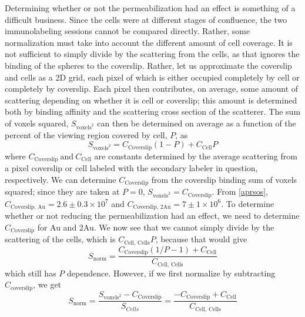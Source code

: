 Determining whether or not the permeabilization had an effect is something of a difficult business. Since the cells were at different stages of confluence, the two immunolabeling sessions cannot be compared directly. Rather, some normalization must take into account the different amount of cell coverage. It is not sufficient to simply divide by the scattering from the cells, as that ignores the binding of the spheres to the coverslip. Rather, let us approximate the coverslip and cells as a 2D grid, each pixel of which is either occupied completely by cell or completely by coverslip. Each pixel then contributes, on average, some amount of scattering depending on whether it is cell or coverslip; this amount is determined both by binding affinity and the scattering cross section of the scatterer. The sum of voxels squared, $S_{\mathrm{voxels}^2}$ can then be determined on average as a function of the percent of the viewing region covered by cell, $P$, as
\[S_{\mathrm{voxels}^2}=C_{\mathrm{Coverslip}}(1-P)+C_{\mathrm{Cell}}P\]
where $C_{\mathrm{Coverslip}}\mathrm{\ and\ }C_{\mathrm{Cell}}$ are constants determined by the average scattering from a pixel coverslip or cell labeled with the secondary labeler in question, respectively. We can determine $C_{\mathrm{Coverslip}}$ from the coverslip binding sum of voxels squared; since they are taken at $P=0$, $S_{\mathrm{voxels}^2}=C_{\mathrm{Coverslip}}$. From \autoref{aprsos}, $C_{\mathrm{Coverslip,\,Au}}=2.6\pm0.3\times10^7$ and $C_{\mathrm{Coverslip,\,2Au}}=7\pm1\times10^6$. To determine whether or not reducing the permeabilization had an effect, we need to determine $C_{\mathrm{Coverslip}}$ for Au and 2Au. We now see that we cannot simply divide by the scattering of the cells, which is $C_{\mathrm{Cell,\,Cells}}P$, because that would give
\[S_{\mathrm{norm}}=\frac{C_{\mathrm{Coverslip}}(1/P-1)+C_{\mathrm{Cell}}}{C_{\mathrm{Cell,\,Cells}}}\]
which still has $P$ dependence. However, if we first normalize by subtracting $C_{\mathrm{coverslip}}$, we get
\begin{equation}
S_{\mathrm{norm}}=\frac{S_{\mathrm{voxels}^2}-C_{\mathrm{Coverslip}}}{S_{Cells}}=\frac{-C_{\mathrm{Coverslip}}+C_{\mathrm{Cell}}}{C_{\mathrm{Cell,\,Cells}}}
\label{eq:normalization}
\end{equation}
